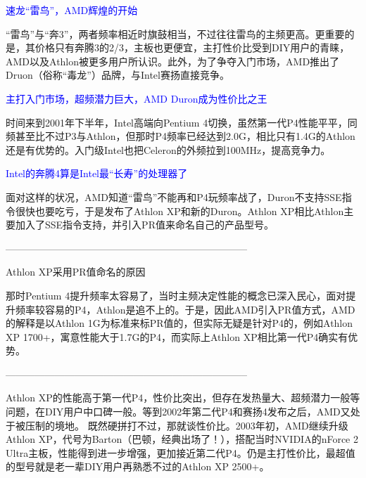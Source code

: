 \documentclass[utf8]{book}
\begin{document}
	\begin{flushleft}
		{\large \textcolor{blue}{速龙“雷鸟”，AMD辉煌的开始\\}}
	\end{flushleft}
	“雷鸟”与“奔3”，两者频率相近时旗鼓相当，不过往往雷鸟的主频更高。更重要的是，其价格只有奔腾3的2/3，主板也更便宜，主打性价比受到DIY用户的青睐，AMD以及Athlon被更多用户所认识。此外，为了争夺入门市场，AMD推出了Druon（俗称“毒龙”）品牌，与Intel赛扬直接竞争。

	\begin{flushleft}
		{\large \textcolor{blue}{主打入门市场，超频潜力巨大，AMD Duron成为性价比之王\\}}
	\end{flushleft}

	时间来到2001年下半年，Intel高端向Pentium 4切换，虽然第一代P4性能平平，同频甚至比不过P3与Athlon，但那时P4频率已经达到2.0G，相比只有1.4G的Athlon还是有优势的。入门级Intel也把Celeron的外频拉到100MHz，提高竞争力。


	\begin{flushleft}
		{\large \textcolor{blue}{Intel的奔腾4算是Intel最“长寿”的处理器了\\}}
	\end{flushleft}

	面对这样的状况，AMD知道“雷鸟”不能再和P4玩频率战了，Duron不支持SSE指令很快也要吃亏，于是发布了Athlon XP和新的Duron。Athlon XP相比Athlon主要加入了SSE指令支持，并引入PR值来命名自己的产品型号。
	
	--------------------------------------------------------------------------
	
	\begin{flushleft}
		{\large Athlon XP采用PR值命名的原因}
	\end{flushleft}

	那时Pentium 4提升频率太容易了，当时主频决定性能的概念已深入民心，面对提升频率较容易的P4，Athlon是追不上的。于是，因此AMD引入PR值方式，AMD的解释是以Athlon 1G为标准来标PR值的，但实际无疑是针对P4的，例如Athlon XP 1700+，寓意性能大于1.7G的P4，而实际上Athlon XP相比第一代P4确实有优势。
	
	--------------------------------------------------------------------------

	Athlon XP的性能高于第一代P4，性价比突出，但存在发热量大、超频潜力一般等问题，在DIY用户中口碑一般。等到2002年第二代P4和赛扬4发布之后，AMD又处于被压制的境地。
	既然硬拼打不过，那就谈性价比。2003年初，AMD继续升级Athlon XP，代号为Barton（巴顿，经典出场了！），搭配当时NVIDIA的nForce 2 Ultra主板，性能得到进一步增强，更加接近第二代P4。仍是主打性价比，最超值的型号就是老一辈DIY用户再熟悉不过的Athlon XP 2500+。
\end{document}
